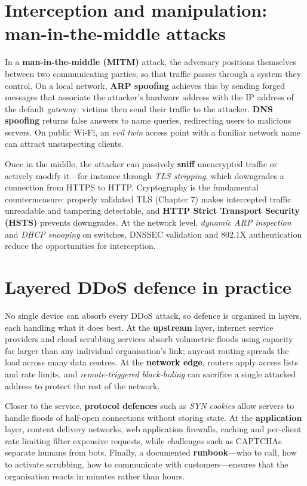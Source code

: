 \section{Interception and manipulation: man-in-the-middle attacks}\label{sec:6.3}
In a \textbf{man-in-the-middle (MITM)} attack, the adversary positions themselves between two communicating parties, so that traffic passes through a system they control. On a local network, \textbf{ARP spoofing} achieves this by sending forged messages that associate the attacker's hardware address with the IP address of the default gateway; victims then send their traffic to the attacker. \textbf{DNS spoofing} returns false answers to name queries, redirecting users to malicious servers. On public Wi-Fi, an \emph{evil twin} access point with a familiar network name can attract unsuspecting clients.

Once in the middle, the attacker can passively \textbf{sniff} unencrypted traffic or actively modify it—for instance through \emph{TLS stripping}, which downgrades a connection from HTTPS to HTTP. Cryptography is the fundamental countermeasure: properly validated TLS (Chapter 7) makes intercepted traffic unreadable and tampering detectable, and \textbf{HTTP Strict Transport Security (HSTS)} prevents downgrades. At the network level, \emph{dynamic ARP inspection} and \emph{DHCP snooping} on switches, DNSSEC validation and 802.1X authentication reduce the opportunities for interception.

\section{Layered DDoS defence in practice}\label{sec:6.4}
No single device can absorb every DDoS attack, so defence is organised in layers, each handling what it does best. At the \textbf{upstream} layer, internet service providers and cloud scrubbing services absorb volumetric floods using capacity far larger than any individual organisation's link; anycast routing spreads the load across many data centres. At the \textbf{network edge}, routers apply access lists and rate limits, and \emph{remote-triggered black-holing} can sacrifice a single attacked address to protect the rest of the network.

Closer to the service, \textbf{protocol defences} such as \emph{SYN cookies} allow servers to handle floods of half-open connections without storing state. At the \textbf{application} layer, content delivery networks, web application firewalls, caching and per-client rate limiting filter expensive requests, while challenges such as CAPTCHAs separate humans from bots. Finally, a documented \textbf{runbook}—who to call, how to activate scrubbing, how to communicate with customers—ensures that the organisation reacts in minutes rather than hours.

